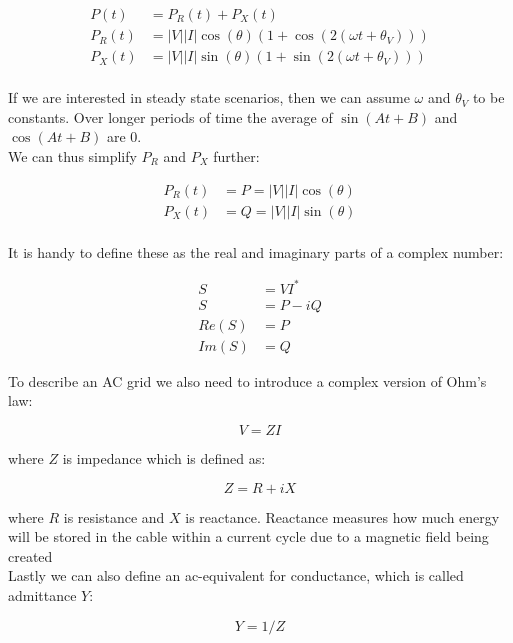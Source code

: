 \begin{equation}
    \begin{aligned}
        P(t)   &= P_R(t) + P_X(t)\\
        P_R(t) &= |V||I| \cos(\theta) (1 + \cos(2(\omega t+\theta_V)))\\
        P_X(t) &= |V||I| \sin(\theta) (1 + \sin(2(\omega t+\theta_V)))\\
    \end{aligned}
    \label{eq:ac:power_react_and_capacitive}
\end{equation}

If we are interested in steady state scenarios, then we can assume $\omega$ and $\theta_V$ 
to be constants. Over longer periods of time the average of $\sin(A t + B)$ and $\cos(A t + B)$ are 0.\\
We can thus simplify $P_R$ and $P_X$ further:

\begin{equation}
    \begin{aligned}
        P_R(t) &= P = |V||I| \cos(\theta)\\
        P_X(t) &= Q = |V||I| \sin(\theta)\\
    \end{aligned}
    \label{eq:ac:power_react_and_imag}
\end{equation}

It is handy to define these as the real and imaginary parts of a complex number:

\begin{equation}
    \begin{aligned}
        S     &=  V I^*\\
        S     &= P - iQ\\
        Re(S) &= P\\ 
        Im(S) &= Q
    \end{aligned}
    \label{eq:ac:complex}
\end{equation}

To describe an AC grid we also need to introduce a complex version
of Ohm's law:

\begin{equation}
    V = ZI
    \label{eq:ac:ohm_complex}
\end{equation}

where $Z$ is impedance which is defined as:

\begin{equation}
    Z = R + iX
    \label{eq:ac:impedance}
\end{equation}

where $R$ is resistance and $X$ is reactance. Reactance measures how much
energy will be stored in the cable within a current cycle due to a magnetic
field being created\\

Lastly we can also define an ac-equivalent for conductance, which is called admittance $Y$:

\begin{equation}
    Y = 1/Z
    \label{eq:ac:admittance}
\end{equation}